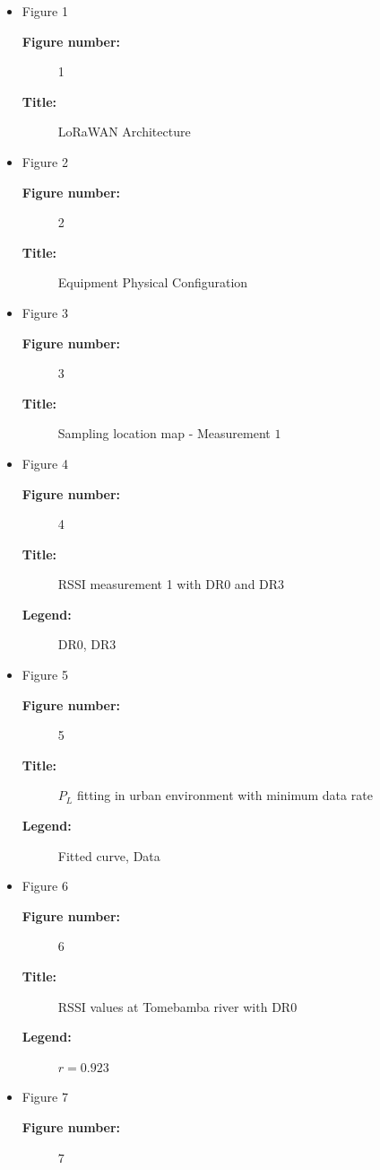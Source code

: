 \begin{itemize}
\item Figure 1
  \begin{description}
  \item [\textbf{Figure number:}] 1
  \item [\textbf{Title:}] LoRaWAN Architecture \cite{Vangelista2015}
  \end{description}
\item Figure 2
  \begin{description}
  \item [\textbf{Figure number:}] 2
  \item [\textbf{Title:}] Equipment Physical Configuration
  \end{description}
\item Figure 3
  \begin{description}
  \item [\textbf{Figure number:}] 3
  \item [\textbf{Title:}] Sampling location map - Measurement $1$
  \end{description}
\item Figure 4
  \begin{description}
  \item [\textbf{Figure number:}] 4
  \item [\textbf{Title:}] RSSI measurement 1 with DR$0$ and DR$3$
  \item [\textbf{Legend:}] DR0, DR3
  \end{description}
\item Figure 5
  \begin{description}
  \item [\textbf{Figure number:}] 5
  \item [\textbf{Title:}] $P_L$ fitting in urban environment with minimum data rate
  \item [\textbf{Legend:}] Fitted curve, Data
  \end{description}
\item Figure 6
  \begin{description}
  \item [\textbf{Figure number:}] 6
  \item [\textbf{Title:}] RSSI values at Tomebamba river with DR$0$
  \item [\textbf{Legend:}] $r=0.923$
  \end{description}
\item Figure 7
  \begin{description}
  \item [\textbf{Figure number:}] 7

\end{description}
\end{itemize}
